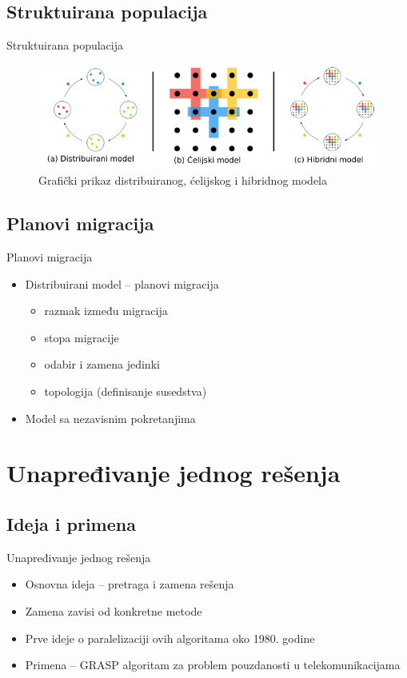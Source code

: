 \documentclass{beamer}
\begin{document}
\subsection{Struktuirana populacija}
\begin{frame}{Struktuirana populacija}
\begin{figure}
    \includegraphics[scale=0.6]{struktuiraniModeli.png}
    \caption{Grafički prikaz distribuiranog, ćelijskog i hibridnog modela}
\end{figure}
\end{frame}

\subsection{Planovi migracija}
\begin{frame}{Planovi migracija}
\begin{itemize}
\item Distribuirani model -- planovi migracija
\begin{itemize}
    \item razmak između migracija
    \item stopa migracije
    \item odabir i zamena jedinki
    \item topologija (definisanje susedstva)
\end{itemize}
\item Model sa nezavisnim pokretanjima

\end{itemize}

\end{frame}

\section{Unapređivanje jednog rešenja}
\subsection{Ideja i primena}
\begin{frame}{Unapređivanje jednog rešenja}
\begin{itemize}
\item Osnovna ideja -- pretraga i zamena rešenja 

\item Zamena zavisi od konkretne metode

\item Prve ideje o paralelizaciji ovih algoritama oko 1980. godine

\item Primena -- GRASP algoritam za problem pouzdanosti u telekomunikacijama

\end{itemize}
\end{frame}
\end{document}
